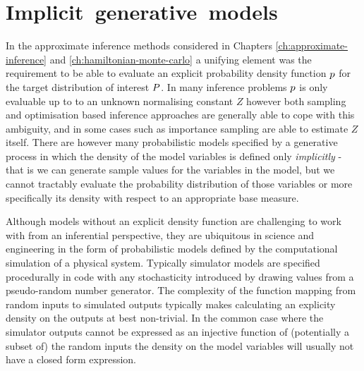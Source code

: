 \chapter{\mbox{Implicit generative models}}\label{ch:differentiable-generative-models}

In the approximate inference methods considered in Chapters \ref{ch:approximate-inference} and \ref{ch:hamiltonian-monte-carlo} a unifying element was the requirement to be able to evaluate an explicit probability density function $p$ for the target distribution of interest $P$. In many inference problems $p$ is only evaluable up to to an unknown normalising constant $Z$ however both sampling and optimisation based inference approaches are generally able to cope with this ambiguity, and in some cases such as importance sampling are able to estimate $Z$ itself. There are however many probabilistic models specified by a generative process in which the density of the model variables is defined only \emph{implicitly} \citep{beaumont2002approximate,gourieroux1993indirect,diggle1984monte} - that is we can generate sample values for the variables in the model, but we cannot tractably evaluate the probability distribution of those variables or more specifically its density with respect to an appropriate base measure. 

Although models without an explicit density function are challenging to work with from an inferential perspective, they are ubiquitous in science and engineering in the form of probabilistic models defined by the computational simulation of a physical system. Typically simulator models are specified procedurally in code with any stochasticity introduced by drawing values from a pseudo-random number generator. %
The complexity of the function mapping from random inputs to simulated outputs typically makes calculating an explicity density on the outputs at best non-trivial. In the common case where the simulator outputs cannot be expressed as an injective function of (potentially a subset of) the random inputs the density on the model variables will usually not have a closed form expression.

